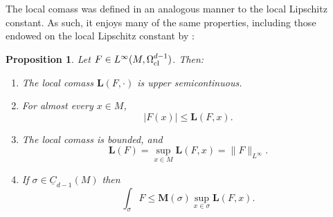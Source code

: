 \documentclass[reqno,11pt]{amsart}
\newcommand{\Chain}{\underline C}
\newcommand{\Mass}{\mathbf M}
\newcommand{\Comass}{\mathbf L}
\newtheorem{proposition}[theorem]{Proposition}
\theoremstyle{definition}
\numberwithin{equation}{section}
\begin{document}
The local comass was defined in an analogous manner to the local Lipschitz constant.
As such, it enjoys many of the same properties, including those endowed on the local Lipschitz constant by \cite[Lemma 4.3]{Crandall2008}:

\begin{proposition}\label{crandall}
Let $F \in L^\infty(M, \Omega^{d - 1}_{\rm cl})$. Then:
\begin{enumerate}
\item The local comass $\Comass(F, \cdot)$ is upper semicontinuous. \label{crandall usc}
\item For almost every $x \in M$, \label{crandall LDT}
$$|F(x)| \leq \Comass(F, x).$$
\item The local comass is bounded, and \label{crandall linfinity}
$$\Comass(F) = \sup_{x \in M} \Comass(F, x) = \|F\|_{L^\infty}.$$
\item If $\sigma \in \Chain_{d - 1}(M)$ then \label{crandall best curl is ABC}
$$\int_\sigma F \leq \Mass(\sigma) \sup_{x \in \sigma} \Comass(F, x).$$
\end{enumerate}
\end{proposition}
\end{document}
